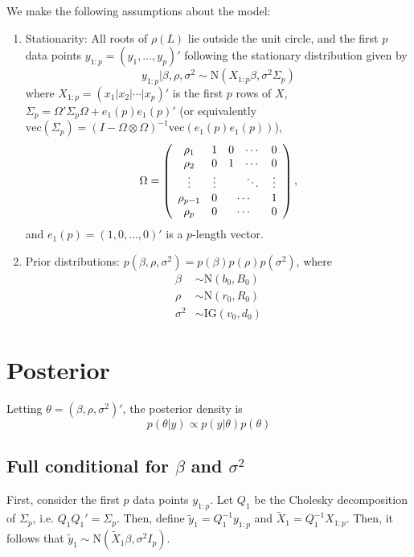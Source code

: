 \documentclass{article}
\begin{document}
We make the following assumptions about the model:
\begin{enumerate}
\item Stationarity: All roots of $\rho(L)$ lie outside the unit circle, and the first $p$ data points $y_{1:p} = (y_1,\ldots,y_p)'$ following the stationary distribution given by \[y_{1:p}|\beta,\rho,\sigma^2 \sim \mbox{N}(X_{1:p}\beta,\sigma^2\Sigma_p)\] where $X_{1:p} = (x_1|x_2|\cdots|x_p)'$ is the first $p$ rows of $X$, $\Sigma_p = \Omega'\Sigma_p\Omega + e_1(p)e_1(p)'$ (or equivalently $\mbox{vec}(\Sigma_p) = (I - \Omega \otimes \Omega)^{-1}\mbox{vec}(e_1(p)e_1(p))$), \[\Omega = \left(\begin{array}{ccccc} \rho_1 & 1 & 0 & \cdots & 0 \\
    \rho_2 & 0 & 1 & \cdots & 0 \\
    \vdots & \vdots & & \ddots & \vdots \\
    \rho_{p-1} & 0 & \multicolumn{2}{c}{\cdots} & 1 \\
    \rho_p & 0 & \multicolumn{2}{c}{\cdots} & 0 \end{array}\right),\] and $e_1(p) = (1,0,\ldots,0)'$ is a $p$-length vector.
\item Prior distributions: $p(\beta,\rho,\sigma^2) = p(\beta)p(\rho)p(\sigma^2)$, where
\begin{align*}
\beta &\sim \mbox{N}(b_0,B_0) \\
\rho &\sim \mbox{N}(r_0,R_0) \\
\sigma^2 &\sim \mbox{IG}(v_0,d_0)
\end{align*}
\end{enumerate}

\section{Posterior}

Letting $\theta = (\beta,\rho,\sigma^2)'$, the posterior density is \[p(\theta|y) \propto p(y|\theta)p(\theta)\]

\subsection{Full conditional for $\beta$ and $\sigma^2$} \label{sec:fullcondbeta}

First, consider the first $p$ data points $y_{1:p}$. Let $Q_1$ be the Cholesky decomposition of $\Sigma_p$, i.e. $Q_1Q_1' = \Sigma_p$. Then, define $\tilde{y}_1 = Q_1^{-1}y_{1:p}$ and $\tilde{X}_1 = Q_1^{-1}X_{1:p}$. Then, it follows that $\tilde{y}_1 \sim \mbox{N}(\tilde{X}_1\beta,\sigma^2I_p)$.
\end{document}
